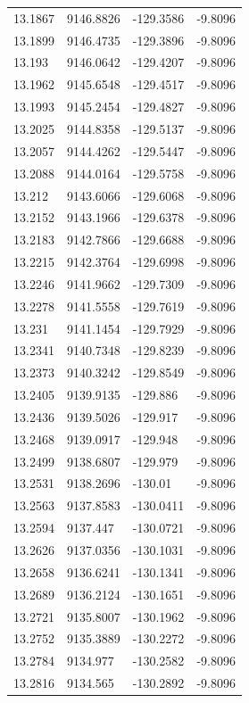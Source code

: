\begin{table}[H]
\begin{tabular}{llll}
13.1867 & 9146.8826 & -129.3586 & -9.8096 \\
13.1899 & 9146.4735 & -129.3896 & -9.8096 \\
13.193 & 9146.0642 & -129.4207 & -9.8096 \\
13.1962 & 9145.6548 & -129.4517 & -9.8096 \\
13.1993 & 9145.2454 & -129.4827 & -9.8096 \\
13.2025 & 9144.8358 & -129.5137 & -9.8096 \\
13.2057 & 9144.4262 & -129.5447 & -9.8096 \\
13.2088 & 9144.0164 & -129.5758 & -9.8096 \\
13.212 & 9143.6066 & -129.6068 & -9.8096 \\
13.2152 & 9143.1966 & -129.6378 & -9.8096 \\
13.2183 & 9142.7866 & -129.6688 & -9.8096 \\
13.2215 & 9142.3764 & -129.6998 & -9.8096 \\
13.2246 & 9141.9662 & -129.7309 & -9.8096 \\
13.2278 & 9141.5558 & -129.7619 & -9.8096 \\
13.231 & 9141.1454 & -129.7929 & -9.8096 \\
13.2341 & 9140.7348 & -129.8239 & -9.8096 \\
13.2373 & 9140.3242 & -129.8549 & -9.8096 \\
13.2405 & 9139.9135 & -129.886 & -9.8096 \\
13.2436 & 9139.5026 & -129.917 & -9.8096 \\
13.2468 & 9139.0917 & -129.948 & -9.8096 \\
13.2499 & 9138.6807 & -129.979 & -9.8096 \\
13.2531 & 9138.2696 & -130.01 & -9.8096 \\
13.2563 & 9137.8583 & -130.0411 & -9.8096 \\
13.2594 & 9137.447 & -130.0721 & -9.8096 \\
13.2626 & 9137.0356 & -130.1031 & -9.8096 \\
13.2658 & 9136.6241 & -130.1341 & -9.8096 \\
13.2689 & 9136.2124 & -130.1651 & -9.8096 \\
13.2721 & 9135.8007 & -130.1962 & -9.8096 \\
13.2752 & 9135.3889 & -130.2272 & -9.8096 \\
13.2784 & 9134.977 & -130.2582 & -9.8096 \\
13.2816 & 9134.565 & -130.2892 & -9.8096 \\

\end{tabular}
\end{table}
